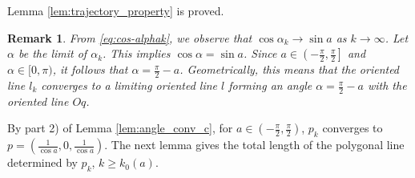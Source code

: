 \documentclass[12pt]{article}
\newtheorem{remark}{Remark}
\begin{document}
Lemma \ref{lem:trajectory_property} is proved.

\begin{remark}
  From \eqref{eq:cos-alphak}, we observe that $\cos \alpha_k \to \sin a$ as $k \to \infty$. Let $\alpha$ be the limit of $\alpha_k$. This implies  $\cos \alpha =  \sin a $.
  Since $a \in \left(-\frac{\pi}{2}, \frac{\pi}{2}\right]$ and $\alpha \in [0, \pi)$, it follows that $\alpha = \frac{\pi}{2} - a$.  
  Geometrically, this means that the oriented line $l_k$ converges to a limiting oriented line $l$ forming an angle $\alpha = \frac{\pi}{2} - a$ with the oriented line $Oq$. 
\end{remark}

By part 2) of Lemma \ref{lem:angle_conv_c}, for  $a \in \left(-\frac{\pi}{2}, \frac{\pi}{2}\right)$, $p_k$ converges to $p=(\frac{1}{\cos a}, 0, \frac{1}{\cos a})$.
The next lemma gives the total length of the polygonal line determined by $p_k$, $k \geq k_0(a)$.
\end{document}
